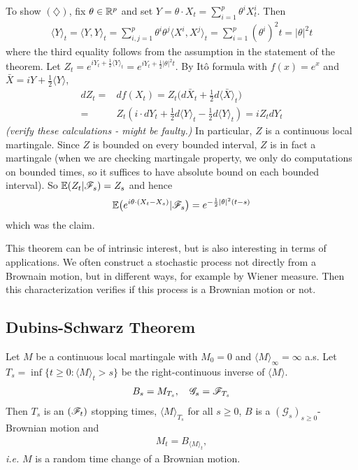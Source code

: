 \documentclass[12pt,a4paper]{article}
\newenvironment{proof}
{\begin{changemargin}{0.5cm}{0.5cm} 
	}%
	{\end{changemargin}
}
\newenvironment{p}
{\begin{proof} 
	}%
	{\end{proof}
}
\begin{document}
\begin{p}
To show $(\diamondsuit)$, fix $\theta \in \mathbb{R}^p$ and set $Y = \theta \cdot X_t = \sum_{i=1}^p \theta^i X_t^i$. Then
\begin{align*}
\langle Y \rangle_t = \langle Y , Y \rangle_t = \sum_{i,j=1}^p \theta^i \theta^j \langle X^i, X^j \rangle_t = \sum_{i=1}^p (\theta^i)^2 t = |\theta|^2 t
\end{align*}
where the third equality follows from the assumption in the statement of the theorem. Let $Z_t = e^{i Y_t + \frac{1}{2} \langle Y \rangle_t} = e^{iY_t + \frac{1}{2} |\theta|^2 t}$. By It\^o formula with $f(x) = e^x$ and $\bar{X}= iY + \frac{1}{2} \langle Y \rangle$,
\begin{align*}
dZ_t =& df(X_t) = Z_t \big( d\bar{X}_t + \frac{1}{2} d\langle \bar{X} \rangle_t \big) \\
=& Z_t (i \cdot dY_t + \frac{1}{2} d\langle Y \rangle_t - \frac{1}{2} d\langle Y \rangle_t) = iZ_t dY_t
\end{align*}
\emph{(verify these calculations - might be faulty.)} In particular, $Z$ is a continuous local martingale. Since $Z$ is bounded on every bounded interval, $Z$ is in fact a martingale (when we are checking martingale property, we only do computations on bounded times, so it suffices to have absolute bound on each bounded interval). So $\mathbb{E}(Z_t | \mathscr{F}_s) = Z_s$ and hence
\begin{align*}
\mathbb{E} \big( e^{i\theta \cdot (X_t - X_s)} | \mathscr{F}_s \big) = e^{-\frac{1}{2} |\theta|^2 (t-s)}
\end{align*}
which was the claim.

\eop
\end{p}
\s

This theorem can be of intrinsic interest, but is also interesting in terms of applications. We often construct a stochastic process not directly from a Brownain motion, but in different ways, for example by Wiener measure. Then this characterization verifies if this process is a Brownian motion or not.

\subsection{Dubins-Schwarz Theorem}

\thm Let $M$ be a continuous local martingale with $M_0 =0$ and $\langle M \rangle_{\infty} =\infty$ a.s. Let $T_s = \inf \{t\geq 0 : \langle M \rangle_t >s \}$ be the right-continuous inverse of $\langle M \rangle$.
\begin{align*}
B_s = M_{T_s}, \quad \mathscr{G}_s = \mathscr{F}_{T_s}
\end{align*}
Then $T_s$ is an $(\mathscr{F}_t)$ stopping times, $\langle M \rangle_{T_s}$ for all $s\geq 0$, $B$ is a $(\mathscr{G}_s)_{s\geq 0}$-Brownian motion and
\begin{align*}
M_t = B_{\langle M \rangle_t},
\end{align*}
\textit{i.e.} $M$ is a random time change of a Brownian motion.
\s
\end{document}
